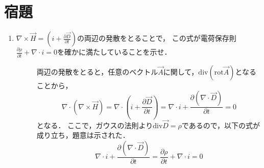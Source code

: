 
\section{宿題}

\begin{enumerate}
    \item $\nabla \times \vec{H}=(i+\frac{\partial \vec{D}}{\partial t})$の両辺の発散をとることで，
    この式が電荷保存則$\frac{\partial \rho}{\partial t}+\nabla\cdot i=0$を確かに満たしていることを示せ．
    \begin{description}
        \item[] 両辺の発散をとると，任意のベクトル$\vec{A}$に関して，$\mathrm{div}(\mathrm{rot} \vec{A})$となることから，
        $$
        \nabla \cdot(\nabla \times \vec{H})=\nabla \cdot\left(i+\frac{\partial \vec{D}}{\partial t}\right)=\nabla \cdot i+\frac{\partial(\nabla \cdot \vec{D})}{\partial t}=0
        $$
        となる．
        ここで，ガウスの法則より$\mathrm{div}\vec{D}=\rho$であるので，以下の式が成り立ち，題意は示された．
        $$
        \nabla \cdot i+\frac{\partial(\nabla \cdot \vec{D})}{\partial t}=\frac{\partial \rho}{\partial t}+\nabla \cdot i=0
        $$

    \end{description}
\end{enumerate}